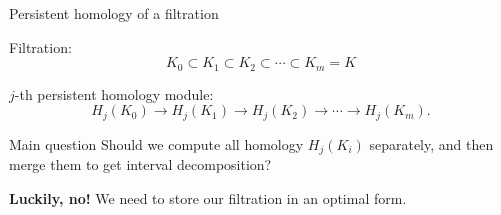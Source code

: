 \documentclass[10pt,xcolor={usenames}]{beamer}
\newcommand{\Zo}{\mathbb{Z}}
\newcommand{\Zt}{\Zo_2}
\begin{document}
%

\begin{frame}{Persistent homology of a filtration}

Filtration:
\[
K_0\subset K_1\subset K_2\subset\cdots\subset K_m=K
\]

$j$-th persistent homology module:
\[
H_j(K_0)\to H_j(K_1)\to H_j(K_2)\to\cdots\to H_j(K_m).
\]
\pause

\begin{block}{Main question}
Should we compute all homology $H_j(K_i)$ separately, and then merge them to get interval decomposition?
\end{block}

\pause
\textbf{Luckily, no!} We need to store our filtration in an optimal form. 

\end{frame}
\end{document}
